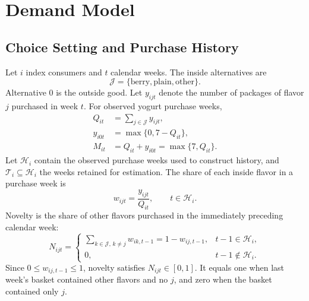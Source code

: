 \documentclass[12pt]{article}
\theoremstyle{definition}
\theoremstyle{remark}
\begin{document}

\section{Demand Model}
\label{sec:demand-model}

\subsection{Choice Setting and Purchase History}
Let $i$ index consumers and $t$ calendar weeks. The inside alternatives are
\begin{equation*}
 \mathcal J=\{\mathrm{berry},\mathrm{plain},\mathrm{other}\}.
\end{equation*}
Alternative $0$ is the outside good. Let $y_{ijt}$ denote the number of packages
of flavor $j$ purchased in week $t$. For observed yogurt purchase weeks,
\begin{align}
 Q_{it}&=\sum_{j\in\mathcal J}y_{ijt},\\
 y_{i0t}&=\max\{0,7-Q_{it}\},\\
 M_{it}&=Q_{it}+y_{i0t}=\max\{7,Q_{it}\}.
\end{align}
Let $\mathcal H_i$ contain the observed purchase weeks used to construct history,
and $\mathcal T_i\subseteq\mathcal H_i$ the weeks retained for estimation.
The share of each inside flavor in a purchase week is
\begin{equation}
 w_{ijt}=\frac{y_{ijt}}{Q_{it}},\qquad t\in\mathcal H_i.
\end{equation}
Novelty is the share of other flavors purchased in the immediately preceding
calendar week:
\begin{equation}
 N_{ijt}=\begin{cases}
 \displaystyle\sum_{k\in\mathcal J,\,k\ne j}w_{ik,t-1}=1-w_{ij,t-1},
 &t-1\in\mathcal H_i,\\[3pt]
 0,&t-1\notin\mathcal H_i.
 \end{cases}
 \label{eq:empirical-novelty}
\end{equation}
Since $0\le w_{ij,t-1}\le1$, novelty satisfies $N_{ijt}\in[0,1]$.
It equals one when last week's basket contained other flavors and no $j$, and
zero when the basket contained only $j$.
\end{document}
